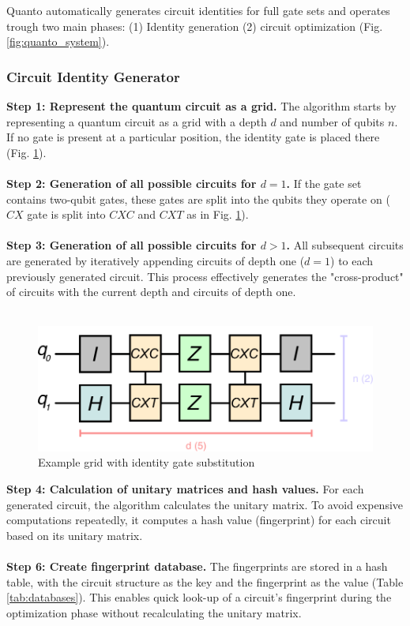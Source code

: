 Quanto automatically generates circuit identities for full gate sets and operates trough two main phases: (1) Identity generation (2) circuit optimization (Fig. \ref{fig:quanto_system}).

\subsubsection{Circuit Identity Generator}
\textbf{Step 1: Represent the quantum circuit as a grid.}
The algorithm starts by representing a quantum circuit as a grid with a depth $d$ and number of qubits $n$. If no gate is present at a particular position, the identity gate is placed there (Fig. \ref{fig:example_1}).
\\\\
\textbf{Step 2: Generation of all possible circuits for $d = 1$.}
If the gate set contains two-qubit gates, these gates are split into the qubits they operate on ($CX$ gate is split into $CXC$ and $CXT$ as in Fig. \ref{fig:example_1}).
\\\\
\textbf{Step 3: Generation of all possible circuits for $d > 1$.}
All subsequent circuits are generated by iteratively appending circuits of depth one ($d=1$) to each previously generated circuit. This process effectively generates the "cross-product" of circuits with the current depth and circuits of depth one.
\\\\
\begin{figure}
  \includegraphics[width=0.8\columnwidth]{assets/grid_example_2.png}
  \caption{Example grid with identity gate substitution}
  \label{fig:example_1}
\end{figure}
\textbf{Step 4: Calculation of unitary matrices and hash values.}
For each generated circuit, the algorithm calculates the unitary matrix. To avoid expensive computations repeatedly, it computes a hash value (fingerprint) for each circuit based on its unitary matrix.
\\\\
\textbf{Step 6: Create fingerprint database.}
The fingerprints are stored in a hash table, with the circuit structure as the key and the fingerprint as the value (Table \ref{tab:databases}). This enables quick look-up of a circuit’s fingerprint during the optimization phase without recalculating the unitary matrix.

